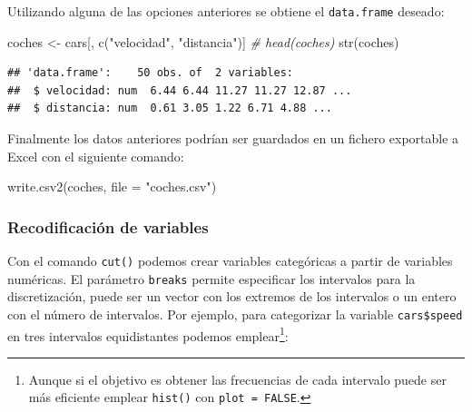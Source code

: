 \documentclass[
]{book}
\newenvironment{Shaded}{\begin{snugshade}}{\end{snugshade}}
\newcommand{\AttributeTok}[1]{\textcolor[rgb]{0.77,0.63,0.00}{#1}}
\newcommand{\CommentTok}[1]{\textcolor[rgb]{0.56,0.35,0.01}{\textit{#1}}}
\newcommand{\DecValTok}[1]{\textcolor[rgb]{0.00,0.00,0.81}{#1}}
\newcommand{\FunctionTok}[1]{\textcolor[rgb]{0.00,0.00,0.00}{#1}}
\newcommand{\NormalTok}[1]{#1}
\newcommand{\OtherTok}[1]{\textcolor[rgb]{0.56,0.35,0.01}{#1}}
\newcommand{\SpecialCharTok}[1]{\textcolor[rgb]{0.00,0.00,0.00}{#1}}
\newcommand{\StringTok}[1]{\textcolor[rgb]{0.31,0.60,0.02}{#1}}
\theoremstyle{break}
\theoremstyle{nonumberplain}
\begin{document}
Utilizando alguna de las opciones anteriores se obtiene el \texttt{data.frame}
deseado:

\begin{Shaded}
\begin{Highlighting}[]
\NormalTok{coches }\OtherTok{\textless{}{-}}\NormalTok{ cars[, }\FunctionTok{c}\NormalTok{(}\StringTok{"velocidad"}\NormalTok{, }\StringTok{"distancia"}\NormalTok{)]}
\CommentTok{\# head(coches)}
\FunctionTok{str}\NormalTok{(coches)}
\end{Highlighting}
\end{Shaded}

\begin{verbatim}
## 'data.frame':    50 obs. of  2 variables:
##  $ velocidad: num  6.44 6.44 11.27 11.27 12.87 ...
##  $ distancia: num  0.61 3.05 1.22 6.71 4.88 ...
\end{verbatim}

Finalmente los datos anteriores podrían ser guardados en un fichero
exportable a Excel con el siguiente comando:

\begin{Shaded}
\begin{Highlighting}[]
\FunctionTok{write.csv2}\NormalTok{(coches, }\AttributeTok{file =} \StringTok{"coches.csv"}\NormalTok{)}
\end{Highlighting}
\end{Shaded}

\hypertarget{recodificaciuxf3n-de-variables}{%
\subsubsection{Recodificación de variables}\label{recodificaciuxf3n-de-variables}}

Con el comando \texttt{cut()} podemos crear variables categóricas a partir de variables numéricas.
El parámetro \texttt{breaks} permite especificar los intervalos para la discretización, puede ser un vector con los extremos de los intervalos o un entero con el número de intervalos.
Por ejemplo, para categorizar la variable \texttt{cars\$speed} en tres intervalos equidistantes podemos emplear\footnote{Aunque si el objetivo es obtener las frecuencias de cada intervalo puede ser más eficiente emplear \texttt{hist()} con \texttt{plot\ =\ FALSE}.}:

\begin{Shaded}
\end{Shaded}
\end{document}
